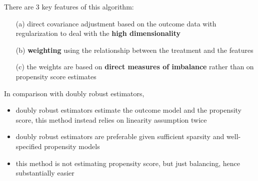 \documentclass[twoside]{article}
\begin{document}
There are 3 key features of this algorithm:
\begin{itemize}
    \item[(a)] direct covariance adjustment based on the outcome data with regularization to deal with the \textbf{high dimensionality}
    \item[(b)] \textbf{weighting} using the relationship between the treatment and the features
    \item[(c)] the weights are based on \textbf{direct measures of imbalance} rather than on propensity score estimates
\end{itemize}

In comparison with doubly robust estimators,
\begin{itemize}
    \item doubly robust estimators estimate the outcome model and the propensity score, this method instead relies on linearity assumption twice
    \item doubly robust estimators are preferable given sufficient sparsity and well-specified propensity models
    \item this method is not estimating propensity score, but just balancing, hence substantially easier
\end{itemize}
\end{document}
